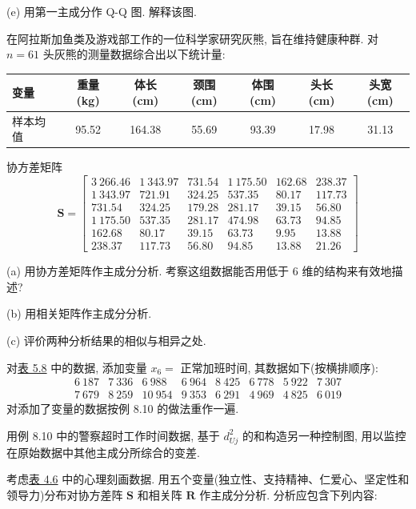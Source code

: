
(e) 用第一主成分作 Q-Q 图. 解释该图.

\quad 在阿拉斯加鱼类及游戏部工作的一位科学家研究灰熊, 旨在维持健康种群. 对 $n=61$ 头灰熊的测量数据综合出以下统计量:

\begin{mvtable}
\begin{tabular}{lcccccc}
\toprule
变量 & 重量(kg) & 体长(cm) & 颈围(cm) & 体围(cm) & 头长(cm) & 头宽(cm) \\
\midrule
样本均值 & 95.52 & 164.38 & 55.69 & 93.39 & 17.98 & 31.13 \\
\bottomrule
\end{tabular}
\end{mvtable}

\noindent 协方差矩阵
\[
\mathbf{S}=
\begin{bmatrix}
3\ 266.46 & 1\ 343.97 & 731.54 & 1\ 175.50 & 162.68 & 238.37\\
1\ 343.97 & 721.91 & 324.25 & 537.35 & 80.17 & 117.73\\
731.54 & 324.25 & 179.28 & 281.17 & 39.15 & 56.80\\
1\ 175.50 & 537.35 & 281.17 & 474.98 & 63.73 & 94.85\\
162.68 & 80.17 & 39.15 & 63.73 & 9.95 & 13.88\\
238.37 & 117.73 & 56.80 & 94.85 & 13.88 & 21.26
\end{bmatrix}
\]

(a) 用协方差矩阵作主成分分析. 考察这组数据能否用低于 6 维的结构来有效地描述?

(b) 用相关矩阵作主成分分析.

(c) 评价两种分析结果的相似与相异之处.

\quad 对\hyperref[tab:5.8]{表 5.8} 中的数据, 添加变量 $x_6=$ 正常加班时间, 其数据如下(按横排顺序):
\[
\begin{array}{rrrrrrrr}
6\ 187 & 7\ 336 & 6\ 988 & 6\ 964 & 8\ 425 & 6\ 778 & 5\ 922 & 7\ 307\\
7\ 679 & 8\ 259 & 10\ 954 & 9\ 353 & 6\ 291 & 4\ 969 & 4\ 825 & 6\ 019
\end{array}
\]
对添加了变量的数据按例 8.10 的做法重作一遍.

\quad 用例 8.10 中的警察超时工作时间数据, 基于 $d_{Uj}^2$ 的和构造另一种控制图, 用以监控在原始数据中其他主成分所综合的变差.

\quad 考虑\hyperref[tab:4.6]{表 4.6} 中的心理刻画数据. 用五个变量(独立性、支持精神、仁爱心、坚定性和领导力)分布对协方差阵 $\mathbf{S}$ 和相关阵 $\mathbf{R}$ 作主成分分析. 分析应包含下列内容:

